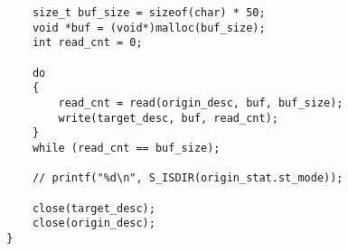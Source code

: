 \documentclass{ctexart}
\begin{document}
\begin{verbatim}
            size_t buf_size = sizeof(char) * 50;
            void *buf = (void*)malloc(buf_size);
            int read_cnt = 0;
        
            do
            {
                read_cnt = read(origin_desc, buf, buf_size);
                write(target_desc, buf, read_cnt);
            }
            while (read_cnt == buf_size);
        
            // printf("%d\n", S_ISDIR(origin_stat.st_mode));
        
            close(target_desc);
            close(origin_desc);
        }
    \end{verbatim}
\end{document}

